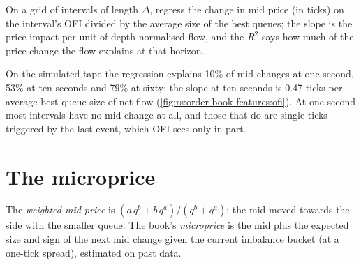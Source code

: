 \begin{method}\label{met:rs:order-book-features:ofi}
On a grid of intervals of length $\Delta$, regress the change in mid price (in ticks) on the interval's OFI divided by the average size
of the best queues; the slope is the price impact per unit of depth-normalised flow, and the $R^2$ says how much of the price change the
flow explains at that horizon.
\end{method}

On the simulated tape the regression explains 10\% of mid changes at one second, 53\% at ten seconds and 79\% at sixty; the slope at ten
seconds is 0.47 ticks per average best-queue size of net flow (\cref{fig:rs:order-book-features:ofi}). At one second most intervals have
no mid change at all, and those that do are single ticks triggered by the last event, which OFI sees only in part.

\begin{omfigure}

\label{fig:rs:order-book-features:ofi}
\end{omfigure}

\section{The microprice}

\begin{definition}\label{def:rs:order-book-features:micro}
The \emph{weighted mid price} is $(a\,q^b + b\,q^a)/(q^b + q^a)$: the mid moved towards the side with the
smaller queue. The book's \emph{microprice} is the mid plus the expected size and sign of the next mid change given the
current imbalance bucket (at a one-tick spread), estimated on past data.
\end{definition}

